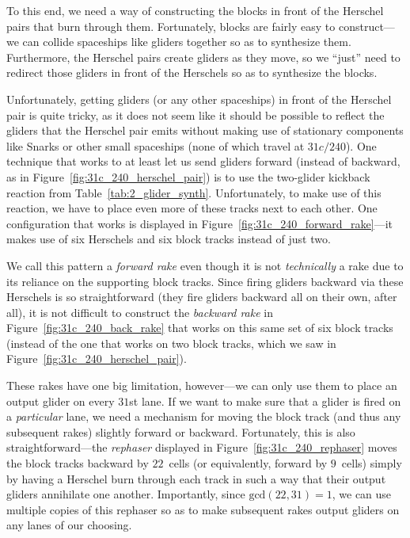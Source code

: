 To this end, we need a way of constructing the blocks in front of the Herschel pairs that burn through them. Fortunately, blocks are fairly easy to construct---we can collide spaceships like gliders together so as to synthesize them. Furthermore, the Herschel pairs create gliders as they move, so we ``just'' need to redirect those gliders in front of the Herschels so as to synthesize the blocks.

Unfortunately, getting gliders (or any other spaceships) in front of the Herschel pair is quite tricky, as it does not seem like it should be possible to reflect the gliders that the Herschel pair emits without making use of stationary components like Snarks or other small spaceships (none of which travel at $31c/240$). One technique that works to at least let us send gliders forward (instead of backward, as in Figure~\ref{fig:31c_240_herschel_pair}) is to use the two-glider kickback reaction from Table~\ref{tab:2_glider_synth}. Unfortunately, to make use of this reaction, we have to place even more of these tracks next to each other. One configuration that works is displayed in Figure~\ref{fig:31c_240_forward_rake}---it makes use of six Herschels and six block tracks instead of just two.

We call this pattern a \emph{forward rake} even though it is not \emph{technically} a rake due to its reliance on the supporting block tracks. Since firing gliders backward via these Herschels is so straightforward (they fire gliders backward all on their own, after all), it is not difficult to construct the \emph{backward rake} in Figure~\ref{fig:31c_240_back_rake} that works on this same set of six block tracks (instead of the one that works on two block tracks, which we saw in Figure~\ref{fig:31c_240_herschel_pair}).

These rakes have one big limitation, however---we can only use them to place an output glider on every $31$st lane. If we want to make sure that a glider is fired on a \emph{particular} lane, we need a mechanism for moving the block track (and thus any subsequent rakes) slightly forward or backward. Fortunately, this is also straightforward---the \emph{rephaser} displayed in Figure~\ref{fig:31c_240_rephaser} moves the block tracks backward by $22$~cells (or equivalently, forward by $9$~cells) simply by having a Herschel burn through each track in such a way that their output gliders annihilate one another. Importantly, since $\mathrm{gcd}(22,31) = 1$, we can use multiple copies of this rephaser so as to make subsequent rakes output gliders on any lanes of our choosing.

